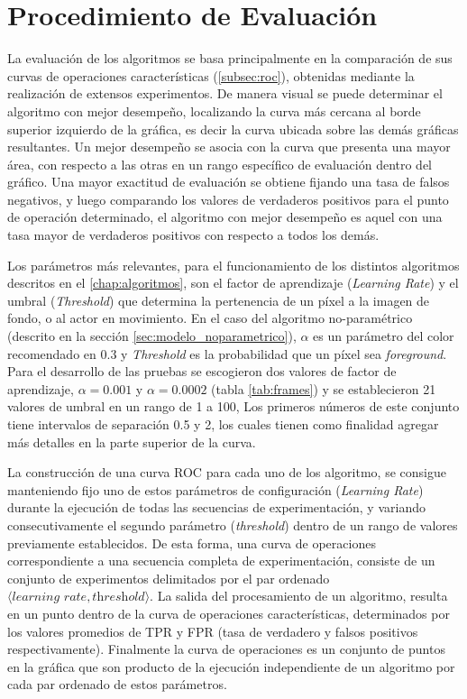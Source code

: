 \section{Procedimiento de Evaluación}
La evaluación de los algoritmos se basa principalmente en la comparación de sus curvas de operaciones características (\autoref{subsec:roc}), obtenidas mediante la realización de extensos experimentos. De manera visual se puede determinar el algoritmo con mejor desempeño, localizando la curva más cercana al borde superior izquierdo de la gráfica, es decir la curva ubicada sobre las demás gráficas resultantes. Un mejor desempeño se asocia con la curva que presenta una mayor área, con respecto a las otras en un rango específico de evaluación dentro del gráfico. Una mayor exactitud de evaluación se obtiene fijando una tasa de falsos negativos, y luego comparando los valores de verdaderos positivos para el punto de operación determinado, el algoritmo con mejor desempeño es aquel con una tasa mayor de verdaderos positivos con respecto a todos los demás.

Los parámetros más relevantes, para el funcionamiento de los distintos algoritmos descritos en el \autoref{chap:algoritmos}, son el factor de aprendizaje (\textit{Learning Rate}) y el umbral (\textit{Threshold}) que determina la pertenencia de un píxel a la imagen de fondo, o al actor en movimiento. En el caso del algoritmo no-paramétrico (descrito en la sección \ref{sec:modelo_noparametrico}), $\alpha$ es un parámetro del color recomendado en $0.3$ y \textit{Threshold} es la probabilidad que un píxel sea \textit{foreground}. Para el desarrollo de las pruebas se escogieron dos valores de factor de aprendizaje, $\alpha=0.001$ y $\alpha=0.0002$ (tabla \ref{tab:frames}) y se establecieron 21 valores de umbral en un rango de 1 a 100, Los primeros números de este conjunto tiene intervalos de separación 0.5 y 2, los cuales tienen como finalidad agregar más detalles en la parte superior de la curva. 

La construcción de una curva ROC para cada uno de los algoritmo, se consigue manteniendo fijo uno de estos parámetros de configuración (\textit{Learning Rate}) durante la ejecución de todas las secuencias de experimentación, y variando consecutivamente el segundo parámetro (\textit{threshold}) dentro de un rango de valores previamente establecidos. De esta forma, una curva de operaciones correspondiente a una secuencia completa de experimentación, consiste de un conjunto de experimentos delimitados por el par ordenado $\langle\textit{learning rate},\textit{threshold}\rangle$. La salida del procesamiento de un algoritmo, resulta en un punto dentro de la curva de operaciones características, determinados por los valores promedios de TPR y FPR (tasa de verdadero y falsos positivos respectivamente). Finalmente la curva de operaciones es un conjunto de puntos en la gráfica que son producto de la ejecución independiente de un algoritmo por cada par ordenado de estos parámetros. 

